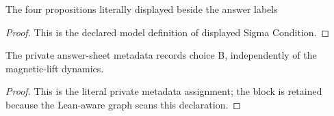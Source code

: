 \begin{definition}
  \label{def:physics:phyx-mini-0954:phyxminiproblems-problemphyxmini0954-displayedsigmacondition}
  The four propositions literally displayed beside the answer labels
\end{definition}
\begin{proof}
  This is the declared model definition of displayed Sigma Condition.
\end{proof}
\begin{definition}
  \label{def:physics:phyx-mini-0954:phyxminiproblems-problemphyxmini0954-recordeddatasetanswer}
  The private answer-sheet metadata records choice B, independently of the magnetic-lift dynamics.
\end{definition}
\begin{proof}
  This is the literal private metadata assignment; the block is retained because the Lean-aware graph scans this declaration.
\end{proof}
